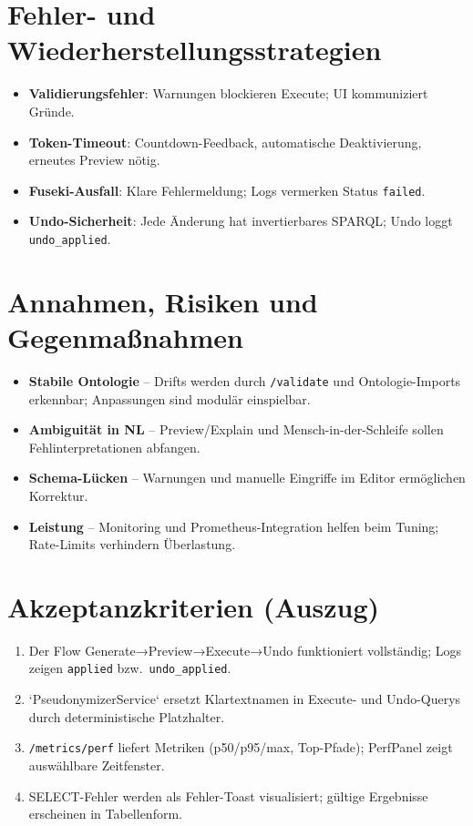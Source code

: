 \section{Fehler- und Wiederherstellungsstrategien}
\begin{itemize}
  \item \textbf{Validierungsfehler}: Warnungen blockieren Execute; UI kommuniziert Gründe.
  \item \textbf{Token-Timeout}: Countdown-Feedback, automatische Deaktivierung, erneutes Preview nötig.
  \item \textbf{Fuseki-Ausfall}: Klare Fehlermeldung; Logs vermerken Status \texttt{failed}.
  \item \textbf{Undo-Sicherheit}: Jede Änderung hat invertierbares SPARQL; Undo loggt \texttt{undo\_applied}.
\end{itemize}

\section{Annahmen, Risiken und Gegenmaßnahmen}
\begin{itemize}
  \item \textbf{Stabile Ontologie} – Drifts werden durch \texttt{/validate} und Ontologie-Imports erkennbar; Anpassungen sind modulär einspielbar.
  \item \textbf{Ambiguität in NL} – Preview/Explain und Mensch-in-der-Schleife sollen Fehlinterpretationen abfangen.
  \item \textbf{Schema-Lücken} – Warnungen und manuelle Eingriffe im Editor ermöglichen Korrektur.
  \item \textbf{Leistung} – Monitoring und Prometheus-Integration helfen beim Tuning; Rate-Limits verhindern Überlastung.
\end{itemize}

\section{Akzeptanzkriterien (Auszug)}
\begin{enumerate}
  \item Der Flow Generate→Preview→Execute→Undo funktioniert vollständig; Logs zeigen \texttt{applied} bzw.\ \texttt{undo\_applied}.
  \item `PseudonymizerService` ersetzt Klartextnamen in Execute- und Undo-Querys durch deterministische Platzhalter.
  \item \texttt{/metrics/perf} liefert Metriken (p50/p95/max, Top-Pfade); PerfPanel zeigt auswählbare Zeitfenster.
  \item SELECT-Fehler werden als Fehler-Toast visualisiert; gültige Ergebnisse erscheinen in Tabellenform.
\end{enumerate}

